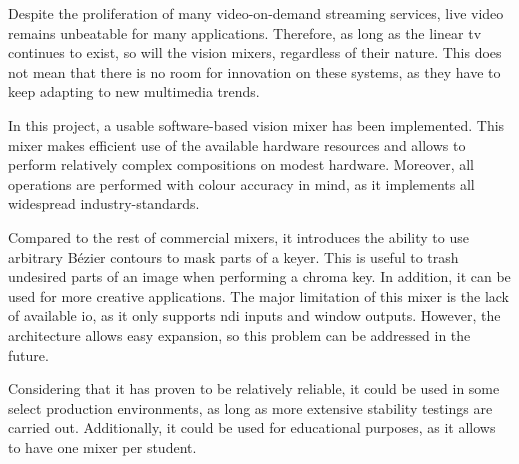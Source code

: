 \documentclass[../main.tex]{subfiles}
\begin{document}
\label{chap:conclusions}
Despite the proliferation of many video-on-demand streaming services, live video remains unbeatable for many applications. Therefore, as long as the linear \gls{tv} continues to exist, so will the vision mixers, regardless of their nature. This does not mean that there is no room for innovation on these systems, as they have to keep adapting to new multimedia trends.\newline

In this project, a usable software-based vision mixer has been implemented. This mixer makes efficient use of the available hardware resources and allows to perform relatively complex compositions on modest hardware. Moreover, all operations are performed with colour accuracy in mind, as it implements all widespread industry-standards.\newline

Compared to the rest of commercial mixers, it introduces the ability to use arbitrary Bézier contours to mask parts of a keyer. This is useful to trash undesired parts of an image when performing a chroma key. In addition, it can be used for more creative applications. The major limitation of this mixer is the lack of available \gls{io}, as it only supports \gls{ndi} inputs and window outputs. However, the architecture allows easy expansion, so this problem can be addressed in the future.\newline 

Considering that it has proven to be relatively reliable, it could be used in some select production environments, as long as more extensive stability testings are carried out. Additionally, it could be used for educational purposes, as it allows to have one mixer per student.\newline



\end{document}
